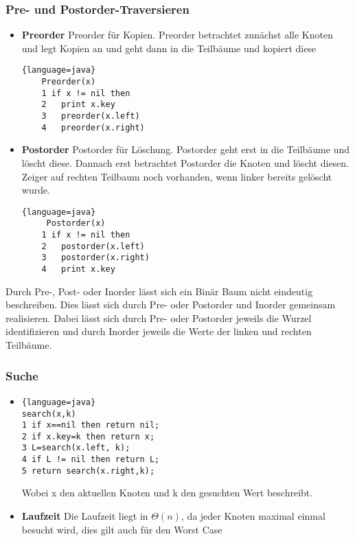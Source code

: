 \documentclass[jou,apacite]{apa6}
\begin{document}
\subsubsection{Pre- und Postorder-Traversieren}
\begin{itemize}
    \item {\bfseries Preorder}
    Preorder für Kopien. Preorder betrachtet zunächst alle Knoten und legt Kopien an und geht dann in die Teilbäume und kopiert diese
    \begin{lstlisting}{language=java}
    Preorder(x)
    1 if x != nil then
    2   print x.key
    3   preorder(x.left)
    4   preorder(x.right)
    \end{lstlisting}
    \item {\bfseries Postorder}
    Postorder für Löschung. Postorder geht erst in die Teilbäume und löscht diese. Dannach erst betrachtet Postorder die Knoten und löscht diesen. Zeiger auf rechten Teilbaum noch vorhanden, wenn linker bereits gelöscht wurde.
    \begin{lstlisting}{language=java}
     Postorder(x)
    1 if x != nil then
    2   postorder(x.left)
    3   postorder(x.right)
    4   print x.key
    \end{lstlisting}
    
\end{itemize}
    Durch Pre-, Post- oder Inorder lässt sich ein Binär Baum nicht eindeutig beschreiben. Dies lässt sich durch Pre- oder Postorder und Inorder gemeinsam realisieren. Dabei lässt sich durch Pre- oder Postorder jeweils die Wurzel identifizieren und durch Inorder jeweils die Werte der linken und rechten Teilbäume.
    
    \subsubsection{Suche}
    \begin{itemize}
        \item 
        \begin{lstlisting}{language=java}
search(x,k)
1 if x==nil then return nil;
2 if x.key=k then return x;
3 L=search(x.left, k);
4 if L != nil then return L;
5 return search(x.right,k);
        \end{lstlisting}
        Wobei x den aktuellen Knoten und k den gesuchten Wert beschreibt.
        \item {\bfseries Laufzeit} Die Laufzeit liegt in $\Theta(n)$, da jeder Knoten maximal einmal besucht wird, dies gilt auch für den Worst Case 
    \end{itemize}
\end{document}
